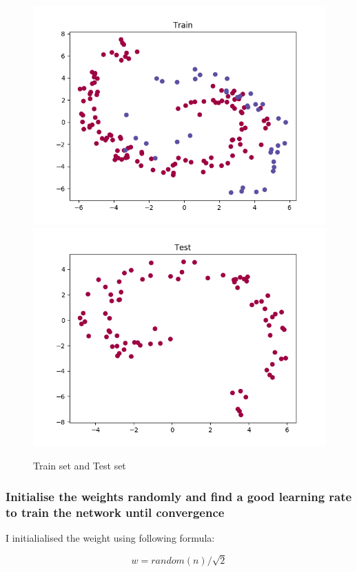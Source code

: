 \documentclass[11pt]{article}
\begin{document}
\begin{figure}[h]
	\centering
	\label{fig: train_test_set}
	\includegraphics[scale=0.5]{images/train_set}
	\includegraphics[scale=0.5]{images/test_set}
	\caption{Train set and Test set}
\end{figure}


\subsubsection{Initialise the weights randomly and find a good learning rate to train the network until convergence}
I initialialised the weight using following formula:

$$w = random(n)/\sqrt{2}$$
\end{document}
